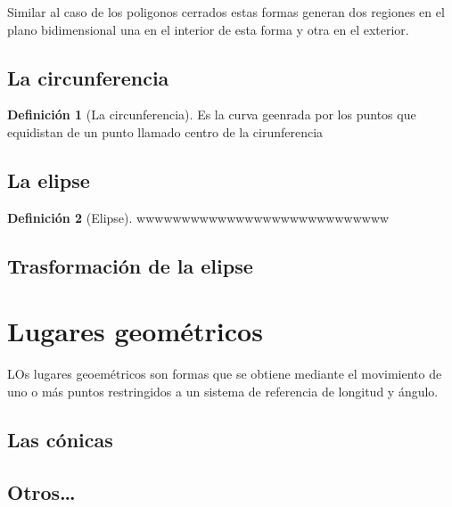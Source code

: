 \documentclass[16pt,]{krantz}
\theoremstyle{definition}
\newtheorem{definition}{Definición}[chapter]
\theoremstyle{definition}
\theoremstyle{definition}
\theoremstyle{definition}
\theoremstyle{remark}
\begin{document}
Similar al caso de los poligonos cerrados estas formas generan dos regiones en el plano bidimensional una en el interior de esta forma y otra en el exterior.

\hypertarget{la-circunferencia}{%
\subsection{La circunferencia}\label{la-circunferencia}}

\begin{definition}[La circunferencia]
\protect\hypertarget{def:circulo}{}{\label{def:circulo} {} }Es la curva geenrada por los puntos que equidistan de un punto llamado centro de la cirunferencia
\end{definition}

\hypertarget{la-elipse}{%
\subsection{La elipse}\label{la-elipse}}

\begin{definition}[Elipse]
\protect\hypertarget{def:elipse}{}{\label{def:elipse} {} }wwwwwwwwwwwwwwwwwwwwwwwwwwww
\end{definition}

\hypertarget{trasformaciuxf3n-de-la-elipse}{%
\subsection{Trasformación de la elipse}\label{trasformaciuxf3n-de-la-elipse}}

\hypertarget{lugares-geomuxe9tricos}{%
\section{Lugares geométricos}\label{lugares-geomuxe9tricos}}

LOs lugares geoemétricos son formas que se obtiene mediante el movimiento de uno o más puntos restringidos a un sistema de referencia de longitud y ángulo.

\hypertarget{las-cuxf3nicas}{%
\subsection{Las cónicas}\label{las-cuxf3nicas}}

\hypertarget{otros}{%
\subsection{Otros\ldots{}}\label{otros}}
\end{document}
